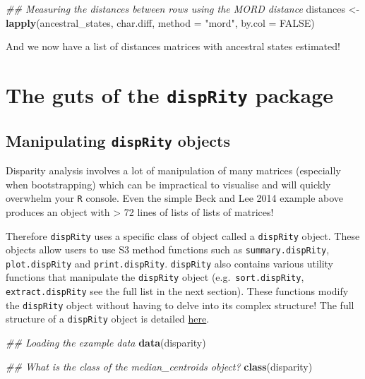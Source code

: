 \documentclass[
]{book}
\newenvironment{Shaded}{\begin{snugshade}}{\end{snugshade}}
\newcommand{\CommentTok}[1]{\textcolor[rgb]{0.56,0.35,0.01}{\textit{#1}}}
\newcommand{\DataTypeTok}[1]{\textcolor[rgb]{0.13,0.29,0.53}{#1}}
\newcommand{\KeywordTok}[1]{\textcolor[rgb]{0.13,0.29,0.53}{\textbf{#1}}}
\newcommand{\NormalTok}[1]{#1}
\newcommand{\OtherTok}[1]{\textcolor[rgb]{0.56,0.35,0.01}{#1}}
\newcommand{\StringTok}[1]{\textcolor[rgb]{0.31,0.60,0.02}{#1}}
\begin{document}
\begin{Shaded}
\begin{Highlighting}[]
\CommentTok{\#\# Measuring the distances between rows using the MORD distance}
\NormalTok{distances \textless{}{-}}\StringTok{ }\KeywordTok{lapply}\NormalTok{(ancestral\_states, char.diff, }\DataTypeTok{method =} \StringTok{"mord"}\NormalTok{, }\DataTypeTok{by.col =} \OtherTok{FALSE}\NormalTok{)}
\end{Highlighting}
\end{Shaded}

And we now have a list of distances matrices with ancestral states estimated!

\hypertarget{the-guts-of-the-disprity-package}{%
\chapter{\texorpdfstring{The guts of the \texttt{dispRity} package}{The guts of the dispRity package}}\label{the-guts-of-the-disprity-package}}

\hypertarget{manipulating-disprity-objects}{%
\section{\texorpdfstring{Manipulating \texttt{dispRity} objects}{Manipulating dispRity objects}}\label{manipulating-disprity-objects}}

Disparity analysis involves a lot of manipulation of many matrices (especially when bootstrapping) which can be impractical to visualise and will quickly overwhelm your \texttt{R} console.
Even the simple Beck and Lee 2014 example above produces an object with \textgreater{} 72 lines of lists of lists of matrices!

Therefore \texttt{dispRity} uses a specific class of object called a \texttt{dispRity} object.
These objects allow users to use S3 method functions such as \texttt{summary.dispRity}, \texttt{plot.dispRity} and \texttt{print.dispRity}.
\texttt{dispRity} also contains various utility functions that manipulate the \texttt{dispRity} object (e.g.~\texttt{sort.dispRity}, \texttt{extract.dispRity} see the full list in the next section).
These functions modify the \texttt{dispRity} object without having to delve into its complex structure!
The full structure of a \texttt{dispRity} object is detailed \href{https://github.com/TGuillerme/dispRity/blob/master/disparity_object.md}{here}.

\begin{Shaded}
\begin{Highlighting}[]
\CommentTok{\#\# Loading the example data}
\KeywordTok{data}\NormalTok{(disparity)}

\CommentTok{\#\# What is the class of the median\_centroids object?}
\KeywordTok{class}\NormalTok{(disparity)}
\end{Highlighting}
\end{Shaded}
\end{document}
